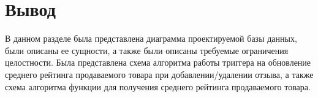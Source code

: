 \section*{Вывод}

В данном разделе была представлена диаграмма проектируемой базы данных, были описаны ее сущности, а также были описаны требуемые ограничения целостности. Была представлена схема алгоритма работы триггера на обновление среднего рейтинга продаваемого товара при добавлении/удалении отзыва, а также схема алгоритма функции для получения среднего рейтинга продаваемого товара.
